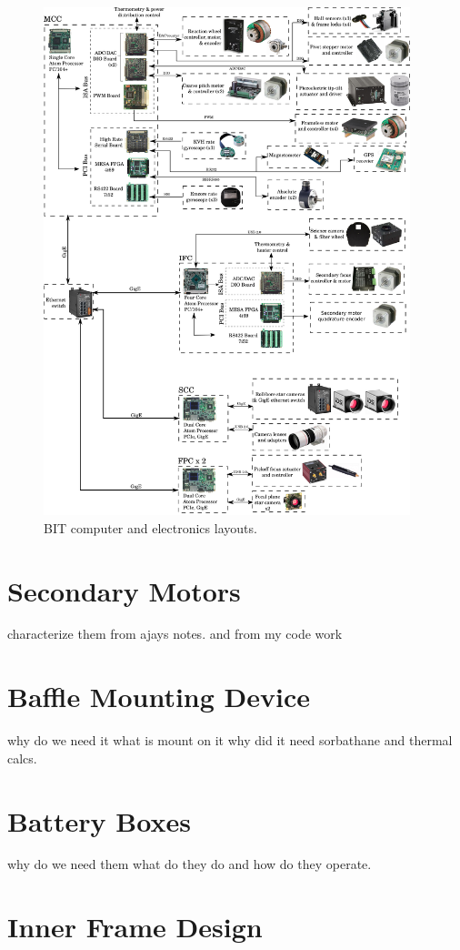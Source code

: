\begin{figure}
    \begin{small}
        \begin{center}
            \includegraphics[width=0.95\textwidth]{Hardware/figs/electronics.png}
        \end{center}
        \caption{BIT computer and electronics layouts.}
        \label{fig:electronics}
    \end{small}
\end{figure}


\section{Secondary Motors}
characterize them from ajays notes. and from my code work

\section{Baffle Mounting Device}
why do we need it what is mount on it why did it need sorbathane and thermal calcs.

\section{Battery Boxes}
why do we need them what do they do and how do they operate.

\section{Inner Frame Design}



